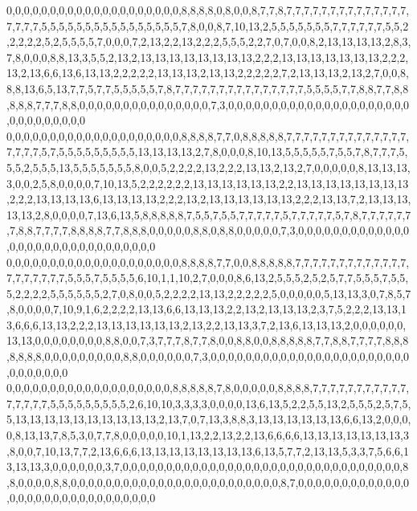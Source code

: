 0,0,0,0,0,0,0,0,0,0,0,0,0,0,0,0,0,0,0,0,8,8,8,8,0,8,0,0,8,7,7,8,7,7,7,7,7,7,7,7,7,7,7,7,7,7,7,7,7,7,5,5,5,5,5,5,5,5,5,5,5,5,5,5,5,5,7,8,0,0,8,7,10,13,2,5,5,5,5,5,5,5,7,7,7,7,7,7,5,5,2,2,2,2,2,5,2,5,5,5,5,7,0,0,0,7,2,13,2,2,13,2,2,2,5,5,5,2,2,7,0,7,0,0,8,2,13,13,13,13,2,8,3,7,8,0,0,0,8,8,13,3,5,5,2,13,2,13,13,13,13,13,13,13,13,2,2,2,13,13,13,13,13,13,13,2,2,2,13,2,13,6,6,13,6,13,13,2,2,2,2,2,13,13,13,2,13,13,2,2,2,2,2,7,2,13,13,13,2,13,2,7,0,0,8,8,8,13,6,5,13,7,7,5,7,7,5,5,5,5,5,7,8,7,7,7,7,7,7,7,7,7,7,7,7,7,7,7,5,5,5,5,7,7,8,8,7,7,8,8,8,8,8,7,7,7,8,8,0,0,0,0,0,0,0,0,0,0,0,0,0,0,0,7,3,0,0,0,0,0,0,0,0,0,0,0,0,0,0,0,0,0,0,0,0,0,0,0,0,0,0,0,0,0,0
0,0,0,0,0,0,0,0,0,0,0,0,0,0,0,0,0,0,0,0,8,8,8,8,7,7,0,8,8,8,8,8,7,7,7,7,7,7,7,7,7,7,7,7,7,7,7,7,7,7,5,7,5,5,5,5,5,5,5,5,5,13,13,13,13,2,7,8,0,0,0,8,10,13,5,5,5,5,5,7,5,5,7,8,7,7,7,5,5,5,2,5,5,5,13,5,5,5,5,5,5,5,8,0,0,5,2,2,2,2,13,2,2,2,13,13,2,13,2,7,0,0,0,0,0,8,13,13,13,3,0,0,2,5,8,0,0,0,0,7,10,13,5,2,2,2,2,2,2,13,13,13,13,13,13,2,2,13,13,13,13,13,13,13,13,2,2,2,13,13,13,13,6,13,13,13,13,2,2,2,13,2,13,13,13,13,13,13,2,2,2,13,13,7,2,13,13,13,13,13,2,8,0,0,0,0,7,13,6,13,5,8,8,8,8,8,7,5,5,7,5,5,7,7,7,7,7,5,7,7,7,7,7,5,7,8,7,7,7,7,7,7,7,8,8,7,7,7,7,8,8,8,8,7,7,8,8,8,0,0,0,0,0,8,8,0,8,8,0,0,0,0,0,7,3,0,0,0,0,0,0,0,0,0,0,0,0,0,0,0,0,0,0,0,0,0,0,0,0,0,0,0,0,0,0
0,0,0,0,0,0,0,0,0,0,0,0,0,0,0,0,0,0,0,0,8,8,8,8,7,7,0,0,8,8,8,8,8,7,7,7,7,7,7,7,7,7,7,7,7,7,7,7,7,7,7,7,7,5,5,5,7,5,5,5,5,6,10,1,1,10,2,7,0,0,0,8,6,13,2,5,5,5,2,5,2,5,7,7,5,5,5,7,5,5,5,2,2,2,2,5,5,5,5,5,5,2,7,0,8,0,0,5,2,2,2,2,13,13,2,2,2,2,2,5,0,0,0,0,0,5,13,13,3,0,7,8,5,7,8,0,0,0,0,7,10,9,1,6,2,2,2,2,13,13,6,6,13,13,13,2,2,13,2,13,13,13,2,3,7,5,2,2,2,13,13,13,6,6,6,13,13,2,2,2,13,13,13,13,13,13,2,13,2,2,13,13,3,7,2,13,6,13,13,13,2,0,0,0,0,0,0,13,13,0,0,0,0,0,0,0,0,8,8,0,0,7,3,7,7,7,8,7,7,8,0,0,8,8,0,0,8,8,8,8,8,7,7,8,8,7,7,7,7,8,8,8,8,8,8,8,0,0,0,0,0,0,0,0,0,8,8,0,0,0,0,0,0,7,3,0,0,0,0,0,0,0,0,0,0,0,0,0,0,0,0,0,0,0,0,0,0,0,0,0,0,0,0,0,0
0,0,0,0,0,0,0,0,0,0,0,0,0,0,0,0,0,0,0,8,8,8,8,8,7,8,0,0,0,0,0,8,8,8,8,7,7,7,7,7,7,7,7,7,7,7,7,7,7,7,7,5,5,5,5,5,5,5,5,5,2,6,10,10,3,3,3,3,0,0,0,0,13,6,13,5,2,2,5,5,13,2,5,5,5,2,5,7,5,5,13,13,13,13,13,13,13,13,13,13,2,13,7,0,7,13,3,8,8,3,13,13,13,13,13,13,6,6,13,2,0,0,0,0,8,13,13,7,8,5,3,0,7,7,8,0,0,0,0,0,10,1,13,2,2,13,2,2,13,6,6,6,6,13,13,13,13,13,13,13,3,8,0,0,7,10,13,7,7,2,13,6,6,6,13,13,13,13,13,13,13,13,6,13,5,7,7,2,13,13,5,3,3,7,5,6,6,13,13,13,3,0,0,0,0,0,0,3,7,0,0,0,0,0,0,0,0,0,0,0,0,0,0,0,0,0,0,0,0,0,0,0,0,0,0,0,0,0,0,0,0,8,8,0,0,0,0,8,8,0,0,0,0,0,0,0,0,0,0,0,0,0,0,0,0,0,0,0,0,0,0,0,0,8,7,0,0,0,0,0,0,0,0,0,0,0,0,0,0,0,0,0,0,0,0,0,0,0,0,0,0,0,0,0,0
